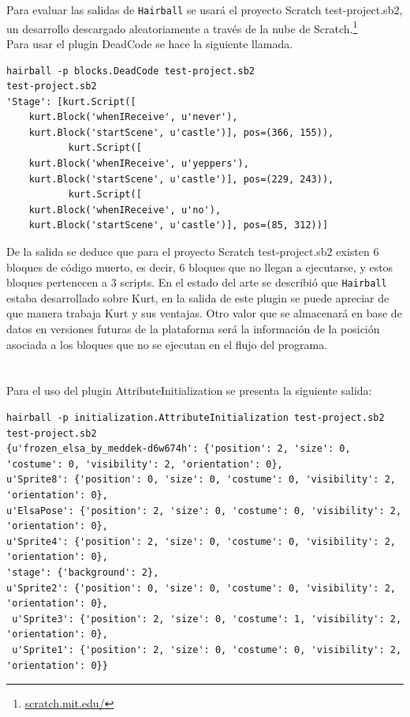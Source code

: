 \documentclass[a4paper, 12pt]{book}
\begin{document}
Para evaluar las salidas de \texttt{Hairball} se usará el proyecto Scratch test-project.sb2, 
un desarrollo descargado aleatoriamente a través de la nube de 
Scratch.\footnote{\url{scratch.mit.edu/}} \\

Para usar el plugin DeadCode se hace la siguiente llamada.
\begingroup
\fontsize{8pt}{9pt}\selectfont
\begin{verbatim}
hairball -p blocks.DeadCode test-project.sb2 
test-project.sb2 
'Stage': [kurt.Script([ 
    kurt.Block('whenIReceive', u'never'), 
    kurt.Block('startScene', u'castle')], pos=(366, 155)), 
           kurt.Script([  
    kurt.Block('whenIReceive', u'yeppers'), 
    kurt.Block('startScene', u'castle')], pos=(229, 243)), 
           kurt.Script([ 
    kurt.Block('whenIReceive', u'no'), 
    kurt.Block('startScene', u'castle')], pos=(85, 312))] 
\end{verbatim}
\endgroup

De la salida se deduce que para el proyecto Scratch test-project.sb2 existen 6 bloques de código
muerto, es decir, 6 bloques que no llegan a ejecutarse, y estos bloques pertenecen a 3 scripts. 
En el estado del arte se describió que \texttt{Hairball} estaba desarrollado sobre Kurt, en la
salida de este plugin se puede apreciar de que manera trabaja Kurt y sus ventajas. Otro valor
que se almacenará en base de datos en versiones futuras de la plataforma será la información de 
la posición asociada a los bloques que no se ejecutan en el flujo del programa. \\ \\ \\

Para el uso del plugin AttributeInitialization se presenta la siguiente salida:

\begingroup
\fontsize{8pt}{8pt}\selectfont
\begin{verbatim}
hairball -p initialization.AttributeInitialization test-project.sb2 
test-project.sb2
{u'frozen_elsa_by_meddek-d6w674h': {'position': 2, 'size': 0, 'costume': 0, 'visibility': 2, 'orientation': 0}, 
u'Sprite8': {'position': 0, 'size': 0, 'costume': 0, 'visibility': 2, 'orientation': 0}, 
u'ElsaPose': {'position': 2, 'size': 0, 'costume': 0, 'visibility': 2, 'orientation': 0}, 
u'Sprite4': {'position': 2, 'size': 0, 'costume': 0, 'visibility': 2, 'orientation': 0}, 
'stage': {'background': 2}, 
u'Sprite2': {'position': 0, 'size': 0, 'costume': 0, 'visibility': 2, 'orientation': 0},
 u'Sprite3': {'position': 2, 'size': 0, 'costume': 1, 'visibility': 2, 'orientation': 0},
 u'Sprite1': {'position': 2, 'size': 0, 'costume': 0, 'visibility': 2, 'orientation': 0}}
\end{verbatim}
\endgroup
\end{document}
